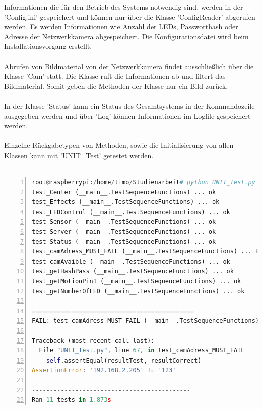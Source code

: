 Informationen die für den Betrieb des Systems notwendig sind, werden in der 'Config.ini' gespeichert und können nur über die Klasse 'ConfigReader' abgerufen werden. Es werden Informationen wie Anzahl der LEDs, Passworthash oder Adresse der Netzwerkkamera abgespeichert. Die Konfigurationsdatei wird beim Installationsvorgang erstellt. \\\\
Abrufen von Bildmaterial von der Netzwerkkamera findet ausschließlich über die Klasse 'Cam' statt. Die Klasse ruft die Informationen ab und filtert das Bildmaterial. Somit geben die Methoden der Klasse nur ein Bild zurück. \\\\
In der Klasse 'Status' kann ein Status des Gesamtsystems in der Kommandozeile ausgegeben werden und über 'Log' können Informationen im Logfile gespeichert werden. \\\\
Einzelne Rückgabetypen von Methoden, sowie die Initialisierung von allen Klassen kann mit 'UNIT\_Test' getestet werden. \\\\

\begin{lstlisting}[caption=Ausgabe der Klasse UNIT\_Test, language=python, frame=single, breaklines=true,columns=fullflexible, commentstyle=\color{gray}\upshape, captionpos=b, numbers = left]
root@raspberrypi:/home/timo/Studienarbeit# python UNIT_Test.py 
test_Center (__main__.TestSequenceFunctions) ... ok
test_Effects (__main__.TestSequenceFunctions) ... ok
test_LEDControl (__main__.TestSequenceFunctions) ... ok
test_Sensor (__main__.TestSequenceFunctions) ... ok
test_Server (__main__.TestSequenceFunctions) ... ok
test_Status (__main__.TestSequenceFunctions) ... ok
test_camAdress_MUST_FAIL (__main__.TestSequenceFunctions) ... FAIL
test_camAvaible (__main__.TestSequenceFunctions) ... ok
test_getHashPass (__main__.TestSequenceFunctions) ... ok
test_getMotionPin1 (__main__.TestSequenceFunctions) ... ok
test_getNumberOfLED (__main__.TestSequenceFunctions) ... ok

=============================================
FAIL: test_camAdress_MUST_FAIL (__main__.TestSequenceFunctions)
--------------------------------------------
Traceback (most recent call last):
  File "UNIT_Test.py", line 67, in test_camAdress_MUST_FAIL
    self.assertEqual(resultTest, resultCorrect)
AssertionError: '192.168.2.205' != '123'

--------------------------------------------
Ran 11 tests in 1.873s
\end{lstlisting}
